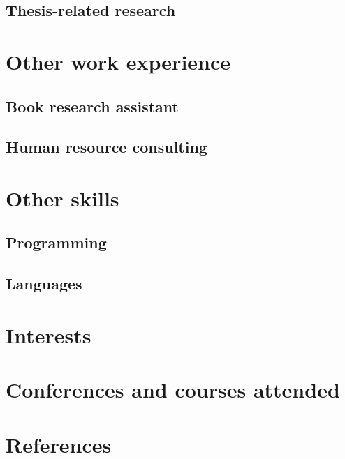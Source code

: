 \documentclass{article}
\begin{document}
\subsection{Thesis-related research}
\blindtext
\section{Other work experience}
\blindtext
\subsection{Book research assistant}
\blindtext
\subsection{Human resource consulting}
\blindtext  
\section{Other skills}
\blindtext
\subsection{Programming}
\blindtext
\subsection{Languages}
\blindtext
\section{Interests}
\blindtext
\section{Conferences and courses attended}
\blindtext
\section{References}
\blindtext
\end{document}
